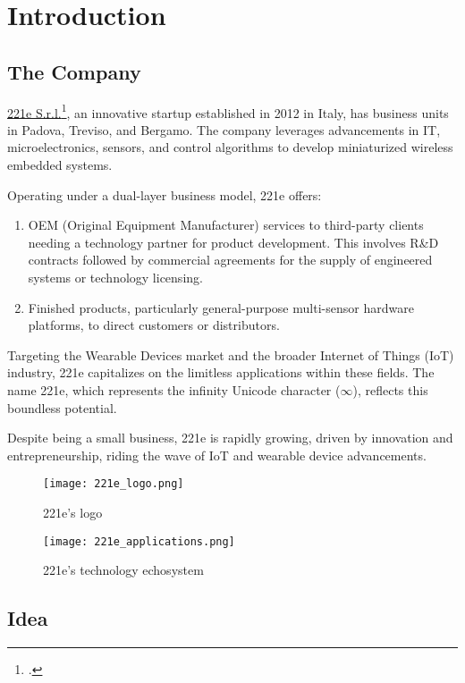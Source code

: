 \chapter{Introduction}
\label{cap:introduction}

\section{The Company}
\href{https://www.221e.com/about-us}{221e S.r.l.}\footcite{site:221e}, an innovative startup established in 2012 in Italy, has business units in Padova, Treviso, and Bergamo. The company leverages advancements in IT, microelectronics, sensors, and control algorithms to develop miniaturized wireless embedded systems.

Operating under a dual-layer business model, 221e offers:
\begin{enumerate}
    \item OEM (Original Equipment Manufacturer) services to third-party clients needing a technology partner for product development. This involves R\&D contracts followed by commercial agreements for the supply of engineered systems or technology licensing.
    \item Finished products, particularly general-purpose multi-sensor hardware platforms, to direct customers or distributors.
\end{enumerate}

Targeting the Wearable Devices market and the broader Internet of Things (IoT) industry, 221e capitalizes on the limitless applications within these fields. The name 221e, which represents the infinity Unicode character (\(\infty\)), reflects this boundless potential.

Despite being a small business, 221e is rapidly growing, driven by innovation and entrepreneurship, riding the wave of IoT and wearable device advancements.

\begin{figure}[htbp]
    \centering
    \texttt{[image: 221e\_logo.png]}
    \caption{221e's logo}
\end{figure}

\begin{figure}[htbp]
    \centering
    \texttt{[image: 221e\_applications.png]}
    \caption{221e's technology echosystem}
\end{figure}


\newpage
\section{Idea}

